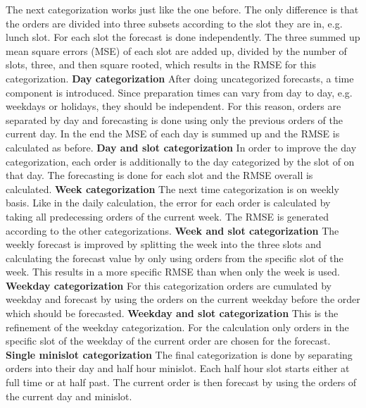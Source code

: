 The next categorization works just like the one before. The only difference is that the orders are divided into three subsets according to the slot they are in, e.g. lunch slot. For each slot the forecast is done independently. The three summed up mean square errors (MSE) of each slot are added up, divided by the number of slots, three, and then square rooted, which results in the RMSE for this categorization.
\newline\newline\textbf{Day categorization}\newline
After doing uncategorized forecasts, a time component is introduced. Since preparation times can vary from day to day, e.g. weekdays or holidays, they should be independent. For this reason, orders are separated by day and forecasting is done using only the previous orders of the current day. In the end the MSE of each day is summed up and the RMSE is calculated as before.
\newline\newline\textbf{Day and slot categorization}\newline
In order to improve the day categorization, each order is additionally to the day categorized by the slot of on that day. The forecasting is done for each slot and the RMSE overall is calculated.
\newline\newline\textbf{Week categorization}\newline
The next time categorization is on weekly basis. Like in the daily calculation, the error for each order is calculated by taking all predecessing orders of the current week. The RMSE is generated according to the other categorizations.
\newline\newline\textbf{Week and slot categorization}\newline
The weekly forecast is improved by splitting the week into the three slots and calculating the forecast value by only using orders from the specific slot of the week. This results in a more specific RMSE than when only the week is used.
\newline\newline\textbf{Weekday categorization}\newline
For this categorization orders are cumulated by weekday and forecast by using the orders on the current weekday before the order which should be forecasted.
\newline\newline\textbf{Weekday and slot categorization}\newline
This is the refinement of the weekday categorization. For the calculation only orders in the specific slot of the weekday of the current order are chosen for the forecast.
\newline\newline\textbf{Single minislot categorization}\newline
The final categorization is done by separating orders into their day and half hour minislot. Each half hour slot starts either at full time or at half past. The current order is then forecast by using the orders of the current day and minislot.\newline

